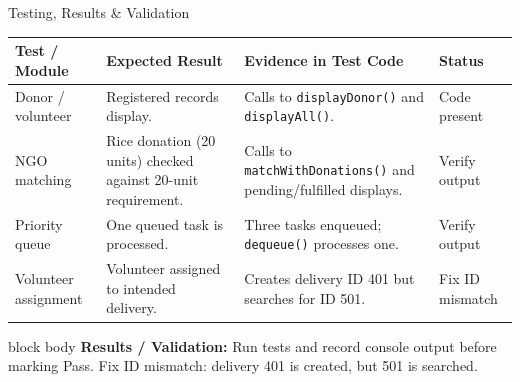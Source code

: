\documentclass[aspectratio=169,11pt]{beamer}
\begin{document}
\begin{frame}{Testing, Results \& Validation}
\scriptsize
\renewcommand{\arraystretch}{1.0}
\setlength{\tabcolsep}{3pt}
\begin{center}
\begin{tabularx}{.97\textwidth}{@{}p{1.55cm}X X p{1.15cm}@{}}
\toprule
\textbf{Test / Module} & \textbf{Expected Result} & \textbf{Evidence in Test Code} & \textbf{Status}\\
\midrule
Donor / volunteer & Registered records display. & Calls to \texttt{displayDonor()} and \texttt{displayAll()}. & Code present\\
NGO matching & Rice donation (20 units) checked against 20-unit requirement. & Calls to \texttt{matchWithDonations()} and pending/fulfilled displays. & Verify output\\
Priority queue & One queued task is processed. & Three tasks enqueued; \texttt{dequeue()} processes one. & Verify output\\
Volunteer assignment & Volunteer assigned to intended delivery. & Creates delivery ID 401 but searches for ID 501. & Fix ID mismatch\\
\bottomrule
\end{tabularx}
\end{center}
\vspace{2mm}
\begin{beamercolorbox}[rounded=true,sep=4pt,wd=.97\textwidth]{block body}
\textbf{Results / Validation:} Run tests and record console output before marking Pass. Fix ID mismatch: delivery 401 is created, but 501 is searched.
\end{beamercolorbox}
\end{frame}
\end{document}
